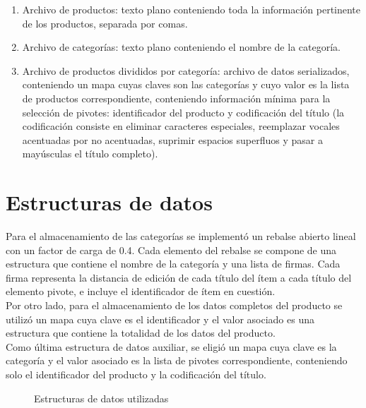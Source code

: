 \begin{enumerate}[(1)]
\item  Archivo de productos: texto plano conteniendo toda la informaci\'on pertinente de los productos, separada por comas.
\item  Archivo de categor\'ias: texto plano conteniendo el nombre de la categor\'ia.
\item  Archivo de productos divididos por categor\'ia: archivo de datos serializados, conteniendo un mapa cuyas claves son las categor\'ias y cuyo valor es la lista de productos correspondiente, conteniendo informaci\'on m\'inima para la selecci\'on de pivotes: identificador del producto y codificaci\'on del t\'itulo (la codificaci\'on consiste en eliminar caracteres especiales, reemplazar vocales acentuadas por no acentuadas, suprimir espacios superfluos y pasar a may\'usculas el t\'itulo completo).
\end{enumerate}

\section{Estructuras de datos}

Para el almacenamiento de las categor\'ias se implement\'o un rebalse abierto lineal con un factor de carga de 0.4.
Cada elemento del rebalse se compone de una estructura que contiene el nombre de la categor\'ia y una lista de firmas. Cada firma representa la distancia de edici\'on de cada t\'itulo del \'item a cada t\'itulo del elemento pivote, e incluye el identificador de \'item en cuesti\'on.\\

Por otro lado, para el almacenamiento de los datos completos del producto se utiliz\'o un mapa cuya clave es el identificador y el valor asociado es una estructura que contiene la totalidad de los datos del producto.\\

Como \'ultima estructura de datos auxiliar, se eligi\'o un mapa cuya clave es la categor\'ia y el valor asociado es la lista de pivotes correspondiente, conteniendo solo el identificador del producto y la codificaci\'on del t\'itulo.\\

\begin{figure}[H]
\centering
{}
		\caption{\small Estructuras de datos utilizadas}
		\label{fig:estructuras}
\end{figure}

